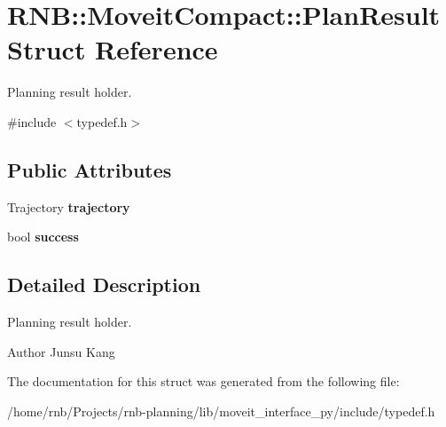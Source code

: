 \hypertarget{struct_r_n_b_1_1_moveit_compact_1_1_plan_result}{}\section{R\+NB\+:\+:Moveit\+Compact\+:\+:Plan\+Result Struct Reference}
\label{struct_r_n_b_1_1_moveit_compact_1_1_plan_result}


Planning result holder.  




{\ttfamily \#include $<$typedef.\+h$>$}

\subsection*{Public Attributes}
\begin{DoxyCompactItemize}
\item 
\mbox{\label{struct_r_n_b_1_1_moveit_compact_1_1_plan_result_a08a7c810afe0f52d919872b7e912826d}} 
Trajectory {\bfseries trajectory}
\item 
\mbox{\label{struct_r_n_b_1_1_moveit_compact_1_1_plan_result_aea46d4251ebb6d54150bb5a98f75fb73}} 
bool {\bfseries success}
\end{DoxyCompactItemize}


\subsection{Detailed Description}
Planning result holder. 

\begin{DoxyAuthor}{Author}
Junsu Kang 
\end{DoxyAuthor}


The documentation for this struct was generated from the following file\+:\begin{DoxyCompactItemize}
\item 
/home/rnb/\+Projects/rnb-\/planning/lib/moveit\+\_\+interface\+\_\+py/include/typedef.\+h\end{DoxyCompactItemize}
